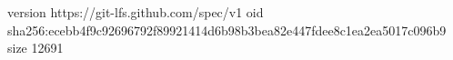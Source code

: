 version https://git-lfs.github.com/spec/v1
oid sha256:ecebb4f9c92696792f89921414d6b98b3bea82e447fdee8c1ea2ea5017c096b9
size 12691
